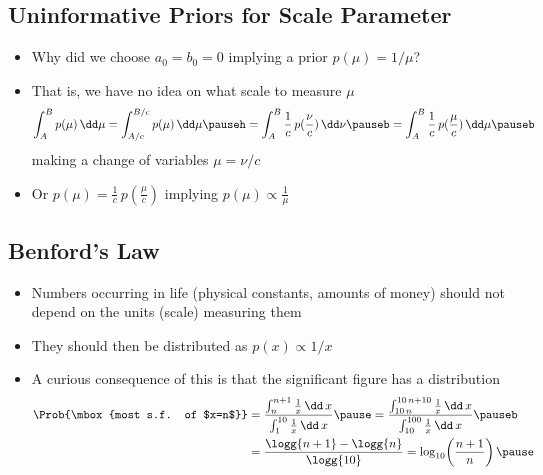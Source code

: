 \begin{slide}
\section[-3]{Uninformative Priors for Scale Parameter}

\pb
\begin{itemize}\pause{}
\item Why did we choose $a_0=b_0=0$ implying a prior
  $p(\mu)=1/\mu$?\pauseh{}
  \begin{center}
    \pause
  \end{center}
\item That is, we have no idea on what scale to measure $\mu$
  \begin{align*}
    \int_A^B p(\mu) \, \dd \mu = \int_{A/c}^{B/c} p(\mu) \, \dd \mu\pauseh
    = \int_A^B \frac{1}{c} \, p(\frac{\nu}{c}) \,\dd \nu\pauseb
    = \int_A^B \frac{1}{c} \, p(\frac{\mu}{c}) \,\dd \mu\pauseb
  \end{align*}
  making a change of variables $\mu=\nu/c$\pauseb
\item Or $ p(\mu)= \frac{1}{c}\, p(\frac{\mu}{c})$ implying
  $p(\mu)\propto \frac{1}{\mu}$\pauseh
\end{itemize}

\end{slide}


\begin{slide}
\section{Benford's Law}

\begin{PauseHighLight}
  \begin{itemize}
  \item Numbers occurring in life (physical constants, amounts of money)
    should not depend on the units (scale) measuring them\pause
  \item They should then be distributed as $p(x) \propto 1/x$\pause
  \item A curious consequence of this is that the significant figure has
    a distribution
    \begin{align*}
      \Prob{\mbox{most s.f. of $x=n$}} &= \frac{ \int_n^{n+1} \frac{1}{x} \,
        \dd \, x}{\int_1^{10} \frac{1}{x} \,
        \dd \, x}\pause = \frac{ \int_{10\,n}^{10\,n+10} \frac{1}{x} \,
        \dd \, x}{\int_{10}^{100} \frac{1}{x} \,
        \dd \, x}\pauseb
      \\
      &=  \frac{\logg{n+1}-\logg{n}}{\logg{10}} =
      \log_{10}\!\left(\frac{n+1}{n}\right)\pause
    \end{align*}
  \end{itemize}
\end{PauseHighLight}

\end{slide}

